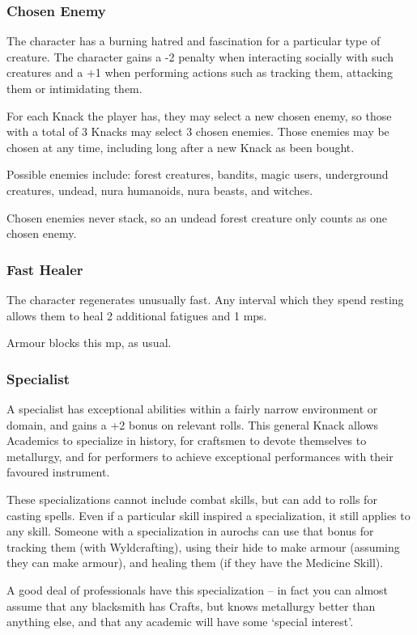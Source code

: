 \begin{multicols}{2}

\subsubsection{Chosen Enemy}

The character has a burning hatred and fascination for a particular type of creature.
The character gains a -2 penalty when interacting socially with such creatures and a +1 when performing actions such as tracking them, attacking them or intimidating them.

For each Knack the player has, they may select a new chosen enemy, so those with a total of 3 Knacks may select 3 chosen enemies. Those enemies may be chosen at any time, including long after a new Knack as been bought.

Possible enemies include: forest creatures, bandits, magic users, underground creatures, undead, nura humanoids, nura beasts, and witches.

Chosen enemies never stack, so an undead forest creature only counts as one chosen enemy.

\subsubsection{Fast Healer}

The character regenerates unusually fast.
Any interval which they spend resting allows them to heal 2 additional \glspl{fatigue} and 1 \glspl{mp}.

Armour blocks this \gls{mp}, as usual.

\subsubsection{Specialist}
\label{specialist}

A specialist has exceptional abilities within a fairly narrow environment or domain, and gains a +2 bonus on relevant rolls.
This general Knack allows Academics to specialize in history, for craftsmen to devote themselves to metallurgy, and for performers to achieve exceptional performances with their favoured instrument.

These specializations cannot include combat skills, but can add to rolls for casting spells.
Even if a particular skill inspired a specialization, it still applies to any skill.
Someone with a specialization in aurochs can use that bonus for tracking them (with Wyldcrafting), using their hide to make armour (assuming they can make armour), and healing them (if they have the Medicine Skill).

A good deal of professionals have this specialization -- in fact you can almost assume that any blacksmith has Crafts, but knows metallurgy better than anything else, and that any academic will have some `special interest'.

\end{multicols}
